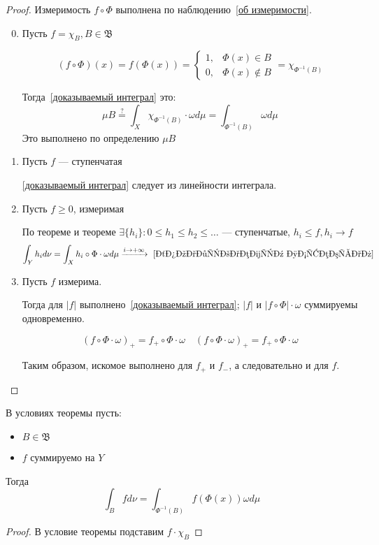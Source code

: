 \begin{proof}
    Измеримость \(f\circ \Phi\) выполнена по наблюдению~\ref{об измеримости}.

    \begin{enumerate}
        \setcounter{enumi}{-1}
        \item Пусть \(f = \chi_B, B \in \mathfrak{B}\)

              \[(f \circ \Phi)(x) = f(\Phi(x)) = \begin{cases}
                      1, & \Phi(x) \in B     \\
                      0, & \Phi(x) \not\in B
                  \end{cases} = \chi_{\Phi^{-1}(B)}\]

              Тогда~\eqref{доказываемый интеграл} это:
              \[\mu B \stackrel{?}{ =} \int_X \chi_{\Phi^{-1}(B)} \cdot \omega d\mu = \int_{\Phi^{-1}(B)} \omega d\mu\]
              Это выполнено по определению \(\mu B\)

        \item Пусть \(f\) --- ступенчатая

              \eqref{доказываемый интеграл} следует из линейности интеграла.

        \item Пусть \(f \geq 0\), измеримая

              По теореме  и теореме  \(\exists \{h_i\} : 0 \leq h_1 \leq h_2 \leq \dots \) --- ступенчатые, \(h_i \leq f, h_i \to f\)
              \[\int_Y h_i d\nu = \int_X h_i \circ \Phi \cdot \omega d \mu \xrightarrow{i \to +\infty}~\eqref{доказываемый интеграл}\]

        \item Пусть \(f\) измерима.

              Тогда для \(|f|\) выполнено~\eqref{доказываемый интеграл}; \(|f|\) и \(|f\circ \Phi|\cdot \omega\) суммируемы одновременно.

              \[(f \circ \Phi\cdot \omega)_+ = f_+ \circ \Phi \cdot \omega \quad (f \circ \Phi\cdot \omega)_+ = f_+ \circ \Phi \cdot \omega\]

              Таким образом, искомое выполнено для \(f_+\) и \(f_-\), а следовательно и для \(f\).
    \end{enumerate}
\end{proof}

\begin{corollary}
    В условиях теоремы пусть:
    \begin{itemize}
        \item \(B\in \mathfrak{B}\)
        \item \(f\) суммируемо на \(Y\)
    \end{itemize}

    Тогда
    \[\int_B f d \nu = \int_{\Phi^{-1}(B)} f(\Phi(x)) \omega d\mu\]
\end{corollary}
\begin{proof}
    В условие теоремы подставим \(f \cdot \chi_B\)
\end{proof}

